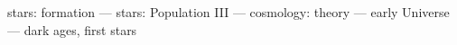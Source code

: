 \begin{keywords}
stars: formation --- stars: Population III --- cosmology: theory --- early Universe --- dark ages, first stars
\end{keywords}